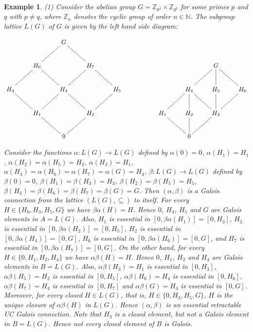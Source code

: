 \documentclass[11pt,a4paper]{amsart}
\newtheorem{ex}[theorem]{Example}
\begin{document}
\begin{ex} \rm \label{e:ex} (1) Consider the abelian group $G=\mathbb{Z}_{p^2}\times \mathbb{Z}_{q^2}$ for some primes
$p$ and $q$ with $p\neq q$, where $\mathbb{Z}_n$ denotes the cyclic group of
order $n\in \mathbb{N}$. The subgroup lattice $L(G)$ of $G$ is given by the left hand side diagram: 
\begin{scriptsize} 
\[\SelectTips{cm}{}
\xymatrix{
 && G \ar@{-}[dl] \ar@{-}[dr] & & &&&&& \\ 
& H_6 \ar@{-}[dl] \ar@{-}[dr] & & H_7 \ar@{-}[dl] \ar@{-}[dr] & & &&& G \ar@{-}[dl] \ar@{-}[d] \ar@{-}[dr] &\\
H_3 \ar@{-}[dr] & & H_4 \ar@{-}[dl] \ar@{-}[dr] & & H_5 \ar@{-}[dl] &&& H_4 \ar@{-}[dl] \ar@{-}[d] \ar@{-}[dr] & H_5
\ar@{-}[d] & H_6 \ar@{-}[dl]\\
& H_1 \ar@{-}[dr] & & H_2 \ar@{-}[dl] &&& H_1 \ar@{-}[dr] & H_2 \ar@{-}[d] & H_3 \ar@{-}[dl] \\
 & & 0 & & &&& 0 & &   
}\]
\end{scriptsize} 

Consider the functions $\alpha:L(G)\to L(G)$ defined by $\alpha(0)=0$, $\alpha(H_1)=H_1$, $\alpha(H_2)=\alpha(H_5)=H_2$,
$\alpha(H_3)=H_1$, $\alpha(H_4)=\alpha(H_6)=\alpha(H_7)=\alpha(G)=H_4$, $\beta:L(G)\to L(G)$ defined by $\beta(0)=0$,
$\beta(H_1)=\beta(H_3)=H_3$, $\beta(H_2)=\beta(H_5)=H_5$, $\beta(H_4)=\beta(H_6)=\beta(H_7)=\beta(G)=G$. Then
$(\alpha,\beta)$ is a Galois connection from the lattice $(L(G),\subseteq)$ to itself. For every $H\in
\{H_0,H_3,H_5,G\}$ we have $\beta\alpha(H)=H$. Hence $0$, $H_3$, $H_5$ and $G$ are Galois elements in $A=L(G)$.
Also, $H_1$ is essential in $[0,\beta\alpha(H_1)]=[0,H_3]$, $H_2$ is essential in $[0,\beta\alpha(H_2)]=[0,H_5]$, $H_2$
is essential in $[0,\beta\alpha(H_4)]=[0,G]$, $H_6$ is essential in $[0,\beta\alpha(H_6)]=[0,G]$, and $H_7$ is essential
in $[0,\beta\alpha(H_7)]=[0,G]$. On the other hand, for every $H\in \{0,H_1,H_2,H_4\}$ we have
$\alpha\beta(H)=H$. Hence $0$, $H_1$, $H_2$ and $H_4$ are Galois elements in $B=L(G)$. Also, $\alpha\beta(H_3)=H_1$ is
essential in $[0,H_3]$, $\alpha\beta(H_5)=H_2$ is essential in $[0,H_5]$, $\alpha\beta(H_6)=H_4$ 
is essential in $[0,H_6]$, $\alpha\beta(H_7)=H_4$ is essential in $[0,H_7]$ and $\alpha\beta(G)=H_4$ is
essential in $[0,G]$. Moreover, for every closed $H\in L(G)$, that is, $H\in \{0,H_3,H_5,G\}$, $H$ is the unique closure
of $\alpha\beta(H)$ in $L(G)$. Hence $(\alpha,\beta)$ is an essential retractable UC Galois connection. Note that $H_3$
is a closed element, but not a Galois element in $B=L(G)$. Hence not every closed element of $B$ is Galois.


\end{ex}
\end{document}
